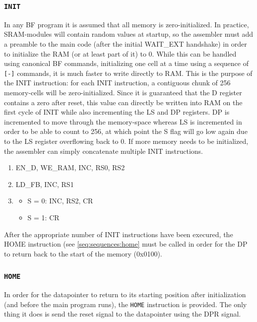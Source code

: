 \documentclass{article}
\begin{document}
\subsubsection{\texttt{INIT}} \label{sec:sequences:init}
In any BF program it is assumed that all memory is zero-initialized. In practice, SRAM-modules will contain random values at startup, so the assembler must add a preamble to the main code (after the initial WAIT\_EXT handshake) in order to initialize the RAM (or at least part of it) to 0. While this can be handled using canonical BF commands, initializing one cell at a time using a sequence of \texttt{[-]} commands, it is much faster to write directly to RAM. This is the purpose of the INIT instruction: for each INIT instruction, a contiguous chunk of 256 memory-cells will be zero-initialized. Since it is guaranteed that the D register contains a zero after reset, this value can directly be written into RAM on the first cycle of INIT while also incrementing the LS and DP registers. DP is incremented to move through the memory-space whereas LS is incremented in order to be able to count to 256, at which point the S flag will go low again due to the LS register overflowing back to 0. If more memory needs to be initialized, the assembler can simply concatenate multiple INIT instructions.
\begin{enumerate}
\item EN\_D, WE\_RAM, INC, RS0, RS2
\item LD\_FB, INC, RS1
\item
  \begin{itemize}
  \item S = 0: INC, RS2, CR
  \item S = 1: CR
  \end{itemize}
\end{enumerate}
After the appropriate number of INIT instructions have been execured, the HOME instruction (see \ref{seq:sequences:home} must be called in order for the DP to return back to the start of the memory (0x0100).

\subsubsection{\texttt{HOME}} \label{sec:sequences:home}
In order for the datapointer to return to its starting position after initialization (and before the main program runs), the \texttt{HOME} instruction is provided. The only thing it does is send the reset signal to the datapointer using the DPR signal.
\end{document}
